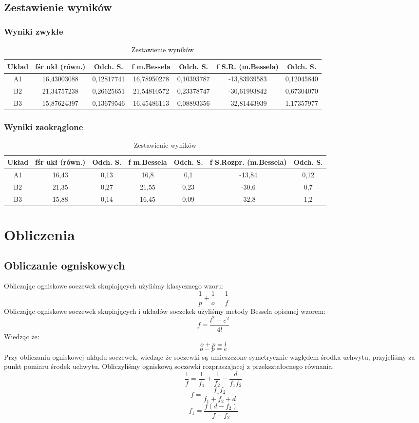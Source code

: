 \documentclass[polish,a4paper]{article}
\begin{document}
\subsection{Zestawienie wyników}
\subsubsection{Wyniki zwykłe}
\begin{table}[H]
\centering
\begin{tabular}{|c|c|c|c|c|c|c|}
\hline
Układ &  fśr ukł (równ.) &  Odch. S. &  f m.Bessela &  Odch. S. &  f S.R. (m.Bessela) &  Odch. S. \\
\hline
A1 &  16,43003088 &  0,12817741 &  16,78950278 &  0,10393787 &  -13,83939583 &  0,12045840 \\
B2 &  21,34757238 &  0,26625651 &  21,54810572 &  0,23378747 &  -30,61993842 &  0,67304070 \\
B3 &  15,87624397 &  0,13679546 &  16,45486113 &  0,08893356 &  -32,81443939 &  1,17357977 \\
\hline
\end{tabular}
\caption{Zestawienie wyników}
\end{table}
\subsubsection{Wyniki zaokrąglone} 
\begin{table}[H]
\centering
\begin{tabular}{|c|c|c|c|c|c|c|}
\hline
Układ &  fśr ukł (równ.) &  Odch. S. &  f m.Bessela &  Odch. S. &  f S.Rozpr. (m.Bessela) &  Odch. S. \\
\hline
A1 &  16,43 &  0,13 &  16,8 &  0,1 &  -13,84 &  0,12 \\
B2 &  21,35 &  0,27 &  21,55 &  0,23 &  -30,6 &  0,7 \\
B3 &  15,88 &  0,14 &  16,45 &  0,09 &  -32,8 &  1,2 \\
\hline
\end{tabular}
\caption{Zestawienie wyników}
\end{table}

\section{Obliczenia}
\subsection{Obliczanie ogniskowych}
Obliczając ogniskowe soczewek skupiających użyliśmy klasycznego wzoru:
$$\frac{1}{p} + \frac{1}{o} = \frac{1}{f}$$
Obliczając ogniskowe soczewek skupiających i układów soczekek użyliśmy metody Bessela opisanej wzorem:
$$ f = \frac{l^2-e^2}{4l} $$
Wiedząc że:
$$o+p=l$$
$$o-p=e$$
Przy obliczaniu ogniskowej ukłądu soczewek, wiedząc że soczewki są umieszczone symetrycznie względem środka uchwytu, przyjęliśmy za punkt pomiaru środek uchwytu. 
Obliczyliśmy ogniskową soczewki rozpraszajacej z przekształocnego równania:
$$\frac{1}{f} = \frac{1}{f_1} + \frac{1}{f_2} - \frac{d}{f_1f_2}$$
$$f = \frac{f_1f_2}{f_1+f_2+d}$$
$$f_1 = \frac{f(d-f_2)}{f-f_2}$$
\end{document}

